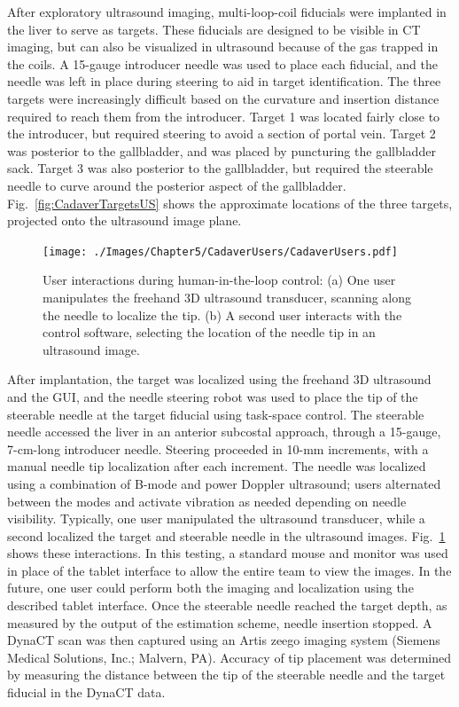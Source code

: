 After exploratory ultrasound imaging, multi-loop-coil fiducials were implanted in the liver to serve as targets. These fiducials are designed to be visible in CT imaging, but can also be visualized in ultrasound because of the gas trapped in the coils. A 15-gauge introducer needle was used to place each fiducial, and the needle was left in place during steering to aid in target identification. The three targets were increasingly difficult based on the curvature and insertion distance required to reach them from the introducer. Target 1 was located fairly close to the introducer, but required steering to avoid a section of portal vein. Target 2 was posterior to the gallbladder, and was placed by puncturing the gallbladder sack. Target 3 was also posterior to the gallbladder, but required the steerable needle to curve around the posterior aspect of the gallbladder. Fig.~\ref{fig:CadaverTargetsUS} shows the approximate locations of the three targets, projected onto the ultrasound image plane.

\begin{figure}[!t]
\centering
\texttt{[image: ./Images/Chapter5/CadaverUsers/CadaverUsers.pdf]}%
\caption[User interactions during human-in-the-loop control]{User interactions during human-in-the-loop control: (a) One user manipulates the freehand 3D ultrasound transducer, scanning along the needle to localize the tip. (b) A second user interacts with the control software, selecting the location of the needle tip in an ultrasound image. }
\label{fig:CadaverUsers}
\end{figure} 

After implantation, the target was localized using the freehand 3D ultrasound and the GUI, and the needle steering robot was used to place the tip of the steerable needle at the target fiducial using task-space control. The steerable needle accessed the liver in an anterior subcostal approach, through a 15-gauge, 7-cm-long introducer needle. Steering proceeded in 10-mm increments, with a manual needle tip localization after each increment. The needle was localized using a combination of B-mode and power Doppler ultrasound; users alternated between the modes and activate vibration as needed depending on needle visibility. Typically, one user manipulated the ultrasound transducer, while a second localized the target and steerable needle in the ultrasound images. Fig.~\ref{fig:CadaverUsers} shows these interactions. In this testing, a standard mouse and monitor was used in place of the tablet interface to allow the entire team to view the images. In the future, one user could perform both the imaging and localization using the described tablet interface. Once the steerable needle reached the target depth, as measured by the output of the estimation scheme, needle insertion stopped. A DynaCT scan was then captured using an Artis zeego imaging system (Siemens Medical Solutions, Inc.; Malvern, PA). Accuracy of tip placement was determined by measuring the distance between the tip of the steerable needle and the target fiducial in the DynaCT data.


